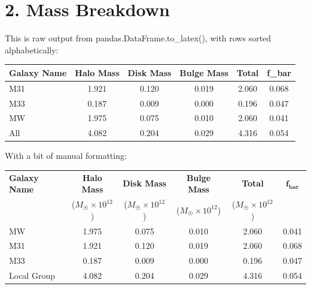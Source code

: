 

\setlength{\parskip}{0.2em}
\setlength{\skip\footins}{20pt}

\newcommand{\hmwkClass}{ASTR 400B}
\newcommand{\hmwkTitle}{Homework 3}
\newcommand{\hmwkDueDate}{Feb 6, 2020}



	
\maketitle

\section*{2. Mass Breakdown}

This is raw output from pandas.DataFrame.to\_latex(), with rows sorted alphabetically:\\

\begin{tabular}{lccccc}
	\toprule
	Galaxy Name &  Halo Mass &  Disk Mass &  Bulge Mass &  Total &  f\_bar \\
	\midrule
	M31 &      1.921 &      0.120 &       0.019 &  2.060 &  0.068 \\
	M33 &      0.187 &      0.009 &       0.000 &  0.196 &  0.047 \\
	MW &      1.975 &      0.075 &       0.010 &  2.060 &  0.041 \\
	All &      4.082 &      0.204 &       0.029 &  4.316 &  0.054 \\
	\bottomrule
\end{tabular}\vspace{5mm}

With a bit of manual formatting:\\

\begin{tabular}{lccccc}
	\toprule
	\textbf{Galaxy Name} &  \textbf{Halo Mass}  &  \textbf{Disk Mass} &  \textbf{Bulge Mass} &  \textbf{Total} &  $\mathbf{f_{bar}}$ \\
	 & ($M_\Sun \times 10^{12}$) & ($M_\Sun \times 10^{12}$) & ($M_\Sun \times 10^{12}$) & ($M_\Sun \times 10^{12}$) & \\
	\midrule
	MW &  1.975 &  0.075 &   0.010 &  2.060 &  0.041 \\
	M31 &  1.921 &  0.120 &   0.019 &  2.060 &  0.068 \\
	M33 &  0.187 &  0.009 &   0.000 &  0.196 &  0.047 \\
	\midrule
	Local Group &  4.082 &  0.204 &   0.029 &  4.316 &  0.054 \\
	\bottomrule
\end{tabular}\vspace{5mm}

